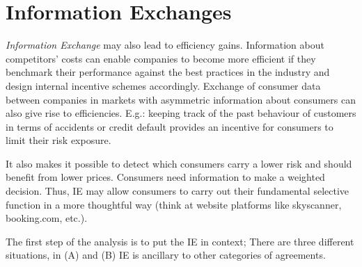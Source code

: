 \section{Information Exchanges}

    \textit{Information Exchange} may also lead to efficiency gains. Information about competitors’ costs can enable companies to become more efficient if they benchmark their performance against the best practices in the industry and design internal incentive schemes accordingly. Exchange of consumer data between companies in markets with asymmetric information about consumers can also give rise to efficiencies. E.g.: keeping track of the past behaviour of customers in terms of accidents or credit default provides an incentive for consumers to limit their risk exposure. 
    
    It also makes it possible to detect which consumers carry a lower risk and should benefit from lower prices. Consumers need information to make a weighted decision. Thus, IE may allow consumers to carry out their fundamental selective function in a more thoughtful way (think at website platforms like skyscanner, booking.com, etc.).

    The first step of the analysis is to put the IE in context; There are three different situations, in (A) and (B) IE is ancillary to other categories of agreements.


